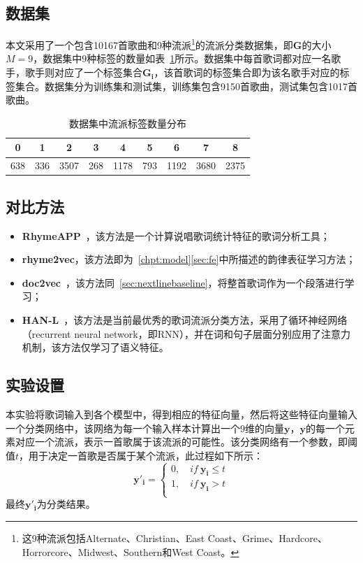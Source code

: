 \subsection{数据集}
本文采用了一个包含10167首歌曲和9种流派\footnote{这9种流派包括Alternate、Christian、East Coast、Grime、Hardcore、Horrorcore、Midwest、Southern和West Coast。}的流派分类数据集，即$\bm G$的大小$M=9$，数据集中$9$种标签的数量如表~\ref{table:genre}所示。数据集中每首歌词都对应一名歌手，歌手则对应了一个标签集合$\bm {G_i}$，该首歌词的标签集合即为该名歌手对应的标签集合。数据集分为训练集和测试集，训练集包含9150首歌曲，测试集包含1017首歌曲。\par

\begin{table}[h]
\centering
\caption{数据集中流派标签数量分布}
\label{table:genre}
\begin{tabular}{ccccccccc}
\toprule
0   & 1   & 2    & 3   & 4    & 5   & 6    & 7    & 8    \\ \midrule
638 & 336 & 3507 & 268 & 1178 & 793 & 1192 & 3680 & 2375 \\ \bottomrule
\end{tabular}
\end{table}

\subsection{对比方法}
\begin{itemize}
  \item{\bf RhymeAPP}~\cite{hirjee2010rhyme}，该方法是一个计算说唱歌词统计特征的歌词分析工具；
  \item{\bf rhyme2vec}，该方法即为~\ref{chpt:model}\ref{sec:fe}中所描述的韵律表征学习方法；
  \item{\bf doc2vec}~\cite{quoc2014distributed}，该方法同~\ref{sec:nextlinebaseline}，将整首歌词作为一个段落进行学习；
  \item{\bf HAN-L}~\cite{Tsaptsinos2017lyrics}，该方法是当前最优秀的歌词流派分类方法，采用了循环神经网络（recurrent neural network，即RNN），并在词和句子层面分别应用了注意力机制，该方法仅学习了语义特征。
\end{itemize}

\subsection{实验设置}
本实验将歌词输入到各个模型中，得到相应的特征向量，然后将这些特征向量输入一个分类网络中，该网络为每一个输入样本计算出一个$9$维的向量$\bm y$，$\bm y$的每一个元素对应一个流派，表示一首歌属于该流派的可能性。该分类网络有一个参数，即阈值$t$，用于决定一首歌是否属于某个流派，此过程如下所示：
\begin{equation}
    \bm {y'_i}=\left\{
    \begin{aligned}
    0 , \quad if \ \bm{y_i}\leq t\\
    1 , \quad if \ \bm{y_i}> t\\
    \end{aligned}
    \right.
\end{equation}
最终$\bm {y'_i}$为分类结果。\par

